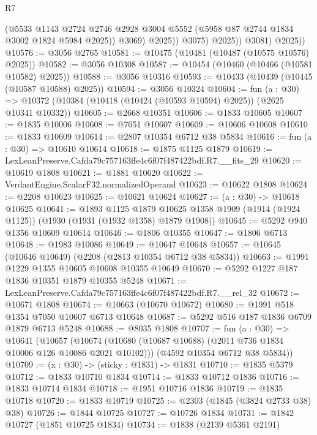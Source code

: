 \begin{lexlean}{R7}
\begin{coremodule}
                      (@5533
                        @1143
                        @2724
                        @2746
                        @2928
                        @3004
                        @5552
                        (@5958 @87 @2744 @1834 @3002 @1824 @5984 @2025))
                      @3069)
                    @2025))
                @3075)
              @2025))
          @3081)
        @2025))
@10576 := @3056 @2765
@10581 := @10475 (@10481 (@10487 (@10575 @10576) @2025))
@10582 := @3056 @10308
@10587 := @10454 (@10460 (@10466 (@10581 @10582) @2025))
@10588 := @3056 @10316
@10593 := @10433 (@10439 (@10445 (@10587 @10588) @2025))
@10594 := @3056 @10324
@10604 := fun (a : @30) =>
  @10372 (@10384 (@10418 (@10424 (@10593 @10594) @2025)) (@2625 @10341 @10332))
@10605 := @2668 @10351
@10606 := @1833 @10605
@10607 := @1835 @10006
@10608 := @7051 @10607
@10609 := @10606 @10608
@10610 := @1833 @10609
@10614 := @2807 @10354 @6712 @38 @5834
@10616 := fun (a : @30) => @10610 @10614
@10618 := @1875 @1125 @1879
@10619 := LexLeanPreserve.Cafda79c757163ffe4c6f07f487422bdf.R7.__fits_29
@10620 := @10619 @1808
@10621 := @1881 @10620
@10622 := VerdantEngine.ScalarF32.normalizedOperand
@10623 := @10622 @1808
@10624 := @2208 @10623
@10625 := @10621 @10624
@10627 := (a : @30) -> @10618 @10625
@10641 := @1893
    @1125
    @1879
    @10625
    @1358
    @1909
    (@1914 (@1924 @1125))
    (@1930 (@1931 (@1932 @1358) @1879 @1908))
@10645 := @5292 @940 @1356 @10609 @10614
@10646 := @1806 @10355
@10647 := @1806 @6713
@10648 := @1983 @10086
@10649 := @10647 @10648
@10657 := @10645 (@10646 @10649) (@2208 (@2813 @10354 @6712 @38 @5834))
@10663 := @1991 @1229 @1355 @10605 @10608 @10355 @10649
@10670 := @5292 @1227 @187 @1836 @10351 @1879 @10355 @5248
@10671 := LexLeanPreserve.Cafda79c757163ffe4c6f07f487422bdf.R7.__rel_32
@10672 := @10671 @1808
@10674 := @10663 (@10670 @10672)
@10680 := @1991 @518 @1354 @7050 @10607 @6713 @10648
@10687 := @5292 @516 @187 @1836 @6709 @1879 @6713 @5248
@10688 := @8035 @1808
@10707 := fun (a : @30) =>
  @10641
    (@10657
      (@10674 (@10680 (@10687 @10688) (@2011 @736 @1834 @10006 @126 @10086 @2021 @10102)))
      (@4592 @10354 @6712 @38 @5834))
@10709 := (x : @30) -> (sticky : @1831) -> @1831
@10710 := @1835 @5379
@10712 := @1833 @10710 @1834
@10714 := @1833 @10712 @1836
@10716 := @1833 @10714 @1834
@10718 := @1951 @10716 @1836
@10719 := @1835 @10718
@10720 := @1833 @10719
@10725 := @2303 (@1845 (@3824 @2733 @38) @38)
@10726 := @1844 @10725
@10727 := @10726 @1834
@10731 := @1842 @10727 (@1851 @10725 @1834)
@10734 := @1838 (@2139 @5361 @2191)

\end{coremodule}
\end{lexlean}
